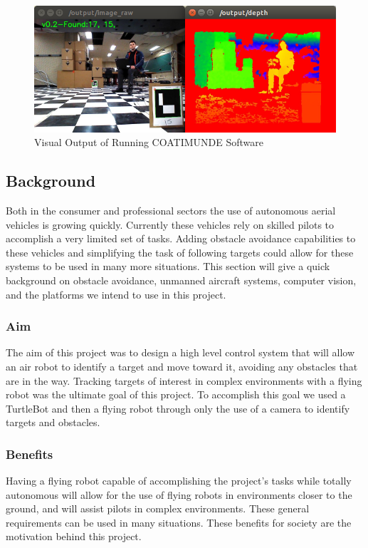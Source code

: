 \documentclass{article}[12]
\begin{document}
	\begin{figure}[]
		\centering
		\includegraphics[width=0.95\linewidth]{results}
		\caption{Visual Output of Running COATIMUNDE Software}
		\label{fig:prettyresultsimage}
	\end{figure}
	
	\subsection{Background}
	
	Both in the consumer and professional sectors the use of autonomous aerial vehicles is growing quickly. Currently these vehicles rely on skilled pilots to accomplish a very limited set of tasks. Adding obstacle avoidance capabilities to these vehicles and simplifying the task of following targets could allow for these systems to be used in many more situations. This section will give a quick background on obstacle avoidance, unmanned aircraft systems, computer vision, and the platforms we intend to use in this project.

		\subsubsection{Aim}
	
		The aim of this project was to design a high level control system that will allow an air robot to identify a target and move toward it, avoiding any obstacles that are in the way. Tracking targets of interest in complex environments with a flying robot was the ultimate goal of this project. To accomplish this goal we used a TurtleBot and then a flying robot through only the use of a camera to identify targets and obstacles. 
		
		\subsubsection{Benefits}
		
		Having a flying robot capable of accomplishing the project's tasks while totally autonomous will allow for the use of flying robots in environments closer to the ground, and will assist pilots in complex environments. These general requirements can be used in many situations. These benefits for society are the motivation behind this project.
		
\end{document}

